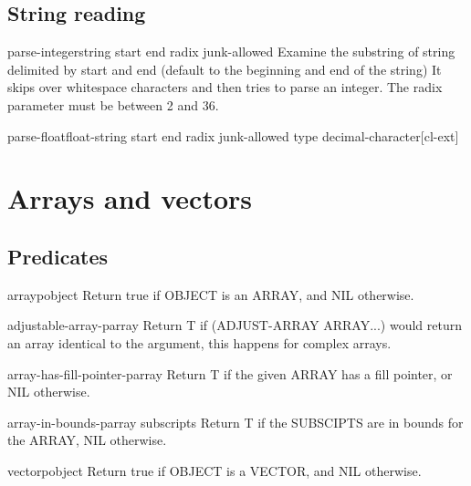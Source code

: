 \documentclass[10pt,english]{book}
\begin{document}
\section{String reading}
\label{sec:string-reading}

\begin{function}{parse-integer}{string \key start end radix junk-allowed}
  Examine the substring of string delimited by start and end
  (default to the beginning and end of the string)  It skips over
  whitespace characters and then tries to parse an integer. The
  radix parameter must be between 2 and 36.
\end{function}

\begin{function}{parse-float}{float-string \key start end radix junk-allowed type decimal-character}[cl-ext]
\end{function}




\chapter{Arrays and vectors}
\label{cha:arrays}

\section{Predicates}
\label{sec:array-predicates}

\begin{function}{arrayp}{object}
  Return true if OBJECT is an ARRAY, and NIL otherwise.
\end{function}

\begin{function}{adjustable-array-p}{array}
  Return T if (ADJUST-ARRAY ARRAY...) would return an array identical
   to the argument, this happens for complex arrays.
\end{function}

\begin{function}{array-has-fill-pointer-p}{array}
  Return T if the given ARRAY has a fill pointer, or NIL otherwise.
\end{function}

\begin{function}{array-in-bounds-p}{array \rest subscripts}
  Return T if the SUBSCIPTS are in bounds for the ARRAY, NIL otherwise.
\end{function}

\begin{function}{vectorp}{object}
  Return true if OBJECT is a VECTOR, and NIL otherwise.
\end{function}
\end{document}

